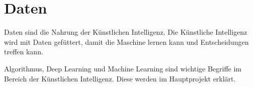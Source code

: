 \section{Daten}
\label{sec:data}

Daten sind die Nahrung der Künstlichen Intelligenz. Die Künstliche Intelligenz wird mit Daten
gefüttert, damit die Maschine lernen kann und Entscheidungen treffen kann.

Algorithmus, Deep Learning und Machine Learning sind wichtige Begriffe im Bereich der Künstlichen Intelligenz. Diese werden im Hauptprojekt erklärt.